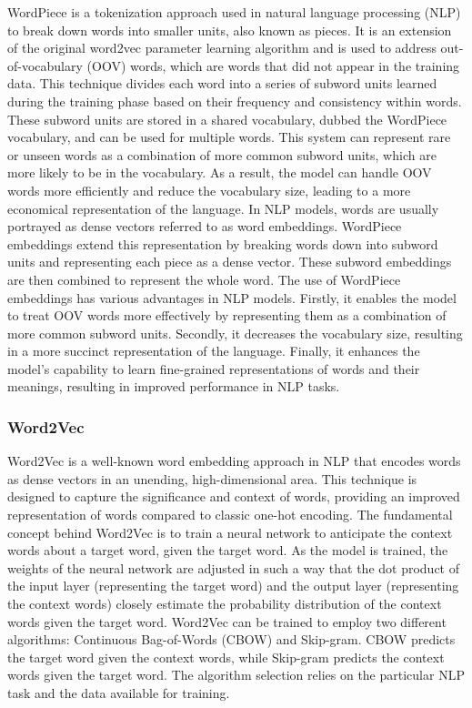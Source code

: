 WordPiece\cite{DBLP:journals/corr/WuSCLNMKCGMKSJL16} is a tokenization approach used in natural language processing (NLP) to break down words into smaller units, also known as pieces. It is an extension of the original word2vec parameter learning algorithm and is used to address out-of-vocabulary (OOV) words, which are words that did not appear in the training data.
This technique divides each word into a series of subword units learned during the training phase based on their frequency and consistency within words. These subword units are stored in a shared vocabulary, dubbed the WordPiece vocabulary, and can be used for multiple words.
This system can represent rare or unseen words as a combination of more common subword units, which are more likely to be in the vocabulary. As a result, the model can handle OOV words more efficiently and reduce the vocabulary size, leading to a more economical representation of the language.
In NLP models, words are usually portrayed as dense vectors referred to as word embeddings. WordPiece embeddings extend this representation by breaking words down into subword units and representing each piece as a dense vector. These subword embeddings are then combined to represent the whole word.
The use of WordPiece embeddings has various advantages in NLP models. Firstly, it enables the model to treat OOV words more effectively by representing them as a combination of more common subword units. Secondly, it decreases the vocabulary size, resulting in a more succinct representation of the language. Finally, it enhances the model's capability to learn fine-grained representations of words and their meanings, resulting in improved performance in NLP tasks.

\subsubsection{Word2Vec}

Word2Vec\cite{DBLP:journals/corr/Rong14} is a well-known word embedding approach in NLP that encodes words as dense vectors in an unending, high-dimensional area. This technique is designed to capture the significance and context of words, providing an improved representation of words compared to classic one-hot encoding.
The fundamental concept behind Word2Vec is to train a neural network to anticipate the context words about a target word, given the target word. As the model is trained, the weights of the neural network are adjusted in such a way that the dot product of the input layer (representing the target word) and the output layer (representing the context words) closely estimate the probability distribution of the context words given the target word.
Word2Vec can be trained to employ two different algorithms: Continuous Bag-of-Words (CBOW) and Skip-gram. CBOW predicts the target word given the context words, while Skip-gram predicts the context words given the target word. The algorithm selection relies on the particular NLP task and the data available for training.

